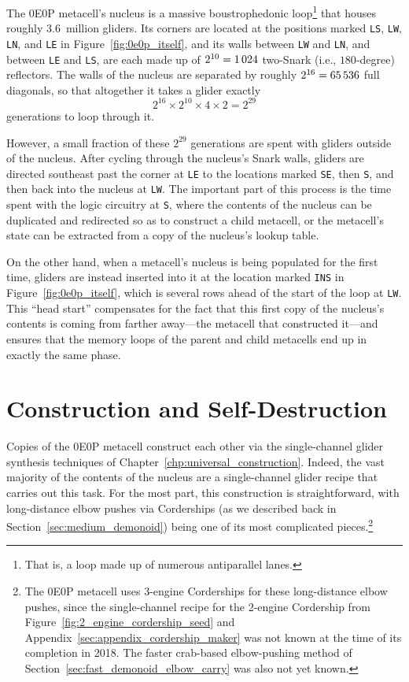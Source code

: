 The 0E0P metacell's nucleus is a massive boustrophedonic loop\footnote{That is, a loop made up of numerous antiparallel lanes.} that houses roughly $3.6$~million gliders. Its corners are located at the positions marked \texttt{LS}, \texttt{LW}, \texttt{LN}, and \texttt{LE} in Figure~\ref{fig:0e0p_itself}, and its walls between \texttt{LW} and \texttt{LN}, and between \texttt{LE} and \texttt{LS}, are each made up of $2^{10} = 1{\,}024$ two-Snark (i.e., $180$-degree) reflectors. The walls of the nucleus are separated by roughly $2^{16} = 65{\,}536$ full diagonals, so that altogether it takes a glider exactly
\[
	2^{16} \times 2^{10} \times 4 \times 2 = 2^{29}
\]
generations to loop through it.

However, a small fraction of these $2^{29}$ generations are spent with gliders outside of the nucleus. After cycling through the nucleus's Snark walls, gliders are directed southeast past the corner at \texttt{LE} to the locations marked \texttt{SE}, then \texttt{S}, and then back into the nucleus at \texttt{LW}. The important part of this process is the time spent with the logic circuitry at \texttt{S}, where the contents of the nucleus can be duplicated and redirected so as to construct a child metacell, or the metacell's state can be extracted from a copy of the nucleus's lookup table.

On the other hand, when a metacell's nucleus is being populated for the first time, gliders are instead inserted into it at the location marked \texttt{INS} in Figure~\ref{fig:0e0p_itself}, which is several rows ahead of the start of the loop at \texttt{LW}. This ``head start'' compensates for the fact that this first copy of the nucleus's contents is coming from farther away---the metacell that constructed it---and ensures that the memory loops of the parent and child metacells end up in exactly the same phase.


\section{Construction and Self-Destruction}\label{sec:0e0p_construction}

Copies of the 0E0P metacell construct each other via the single-channel glider synthesis techniques of Chapter~\ref{chp:universal_construction}. Indeed, the vast majority of the contents of the nucleus are a single-channel glider recipe that carries out this task. For the most part, this construction is straightforward, with long-distance elbow pushes via Corderships (as we described back in Section~\ref{sec:medium_demonoid}) being one of its most complicated pieces.\footnote{The 0E0P metacell uses 3-engine Corderships for these long-distance elbow pushes, since the single-channel recipe for the 2-engine Cordership from Figure~\ref{fig:2_engine_cordership_seed} and Appendix~\ref{sec:appendix_cordership_maker} was not known at the time of its completion in 2018. The faster crab-based elbow-pushing method of Section~\ref{sec:fast_demonoid_elbow_carry} was also not yet known.}

